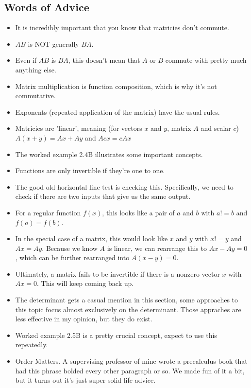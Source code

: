 	\subsection{Words of Advice}
		\begin{itemize}
			\item It is incredibly important that you know that matricies don't commute.
			\item $AB$ is NOT generally $BA$.
			\item Even if $AB$ is $BA$, this doesn't mean that $A$ or $B$ commute with pretty much anything else.
			\item Matrix multiplication is function composition, which is why it's not commutative.
			\item Exponents (repeated application of the matrix) have the usual rules.
			\item Matricies are 'linear', meaning (for vectors $x$ and $y$, matrix $A$ and scalar $c$) $A(x+y) = Ax+Ay$ and $Acx = cAx$
			\item The worked example 2.4B illustrates some important concepts.
			\item Functions are only invertible if they're one to one.
			\item The good old horizontal line test is checking this. Specifically, we need to check if there are two inputs that give us the same output.
			\item For a regular function $f(x)$, this looks like a pair of $a$ and $b$ with $a != b$ and $f(a) = f(b)$.
			\item In the special case of a matrix, this would look like $x$ and $y$ with $x != y$ and $Ax = Ay$. Because we know $A$ is linear, we can rearrange this to $Ax-Ay=0$, which can be further rearranged into $A(x - y) =0$.
			\item Ultimately, a matrix fails to be invertible if there is a nonzero vector $x$ with $Ax=0$. This will keep coming back up.
			\item The determinant gets a casual mention in this section, some approaches to this topic focus almost exclusively on the determinant. Those appraches are less effective in my opinion, but they do exist.
			\item Worked example 2.5B is a pretty crucial concept, expect to use this repeatedly.
			\item Order Matters. A supervising professor of mine wrote a precalculus book that had this phrase bolded every other paragraph or so. We made fun of it a bit, but it turns out it's just super solid life advice.
		\end{itemize}

